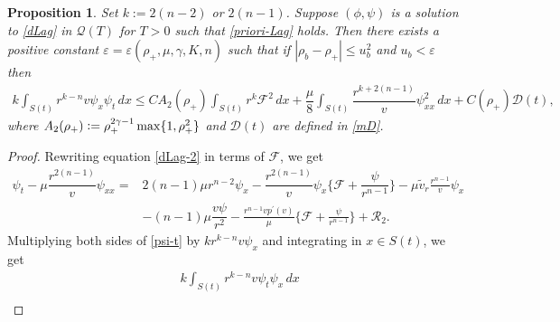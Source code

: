 \documentclass[a4paper,12pt,draft]{article}
\newtheorem{proposition}[theorem]{Proposition}
\theoremstyle{remark}
\def\ut{\tilde{u}}
\def\vt{\tilde{v}}
\def\ep{\varepsilon}
\def\mD{\mathcal{D}}
\def\mF{\mathcal{F}}
\def\mQ{\mathcal{Q}}
\def\mR{\mathcal{R}}
\begin{document}
\begin{proposition} \label{prop:psitx}
    Set $k:= 2(n-2)$ or $2(n-1)$. Suppose $(\phi,\psi)$ is a solution to \eqref{dLag} in $\mQ(T)$ for $T>0$ such that \eqref{priori-Lag} holds. Then there exists a positive constant $\ep=\ep(\rho_+,\mu,\gamma,K,n)$ such that if $|\rho_b-\rho_+|\le u_b^2$ and $u_b< \ep$ then
    \begin{gather*}
        k \int_{S(t)} \! \! r^{k-n} v \psi_x \psi_t\, dx \le  C A_2(\rho_{+})\int_{S(t)}\!\! r^k \mF^2\, dx + \dfrac{\mu}{8} \int_{S(t)}\!\!\!\! \dfrac{r^{k+2(n-1)}}{v}\psi_{xx}^2\, dx + C(\rho_{+})\mD(t),
    \end{gather*}
    where $A_2(\rho_{+}) \vcentcolon= \rho_{+}^{2\gamma-1} \max\{1,\rho_{+}^2\}$ and $\mD(t)$ are defined in \eqref{mD}.
\end{proposition}
\begin{proof}
    Rewriting equation \eqref{dLag-2} in terms of $\mF$, we get
    \begin{align}
        \psi_t - \mu \dfrac{r^{2(n-1)}}{v}\psi_{xx} =& 2(n-1)\mu r^{n-2}\psi_x - \dfrac{r^{2(n-1)}}{v} \psi_x \big\{ \mF + \dfrac{\psi}{r^{n-1}} \big\} - \mu \vt_r \frac{r^{n-1}}{v} \psi_x \nonumber\\
        &-(n-1)\mu \dfrac{v \psi}{r^2} - \frac{r^{n-1}v p^{\prime}(v)}{\mu} \big\{ \mF + \frac{\psi}{r^{n-1}} \big\} + \mR_2. \label{psi-t}
    \end{align}
    Multiplying both sides of \eqref{psi-t} by $kr^{k-n} v\psi_x $ and integrating in $x\in S(t)$, we get
    \begin{align*}
        &k\int_{S(t)}\!\! r^{k-n} v \psi_t \psi_x \, d x\nonumber\\

\end{align*}
\end{proof}
\end{document}
